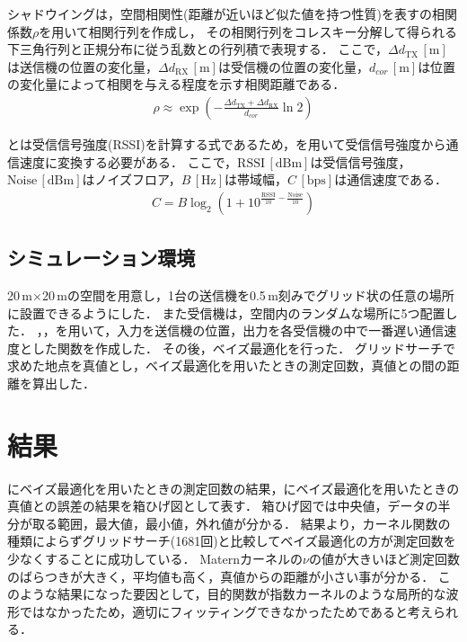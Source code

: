 \documentclass[twocolumn]{ltjarticle}
\begin{document}
シャドウイングは，空間相関性(距離が近いほど似た値を持つ性質)を表すの相関係数\(\rho\)を用いて相関行列を作成し，
その相関行列をコレスキー分解して得られる下三角行列と正規分布に従う乱数との行列積で表現する\cite{shadowing}．
ここで，\(\Delta d_{\mathrm{TX}}\,\mathrm{[m]}\)は送信機の位置の変化量，\(\Delta d_{\mathrm{RX}}\,\mathrm{[m]}\)は受信機の位置の変化量，\(d_{cor}\,\mathrm{[m]}\)は位置の変化量によって相関を与える程度を示す相関距離である．
\begin{align}
	\rho \approx \exp \left( - \frac{\Delta d_{\mathrm{TX}} + \Delta d_{\mathrm{RX}}}{d_{cor}} \ln 2 \right) \label{eq:shadowing}
\end{align}

とは受信信号強度(RSSI)を計算する式であるため，を用いて受信信号強度から通信速度に変換する必要がある．
ここで，\(\mathrm{RSSI}\,[\mathrm{dBm}]\)は受信信号強度，\(\mathrm{Noise}\,[\mathrm{dBm}]\)はノイズフロア，\(B\,[\mathrm{Hz}]\)は帯域幅，\(C\,[\mathrm{bps}]\)は通信速度である．
\begin{align}
	C = B \log_2 \left( 1 + 10^{\frac{\mathrm{RSSI}}{10}-\frac{\mathrm{Noise}}{10}} \right) \label{eq:capacity}
\end{align}
\subsection{シミュレーション環境}

20\(\,\)m\(\times\)20\(\,\)mの空間を用意し，1台の送信機を0.5\(\,\mathrm{m}\)刻みでグリッド状の任意の場所に設置できるようにした．
また受信機は，空間内のランダムな場所に5つ配置した．
，，を用いて，入力を送信機の位置，出力を各受信機の中で一番遅い通信速度とした関数を作成した．
その後，ベイズ最適化を行った．
グリッドサーチで求めた地点を真値とし，ベイズ最適化を用いたときの測定回数，真値との間の距離を算出した．
\section{結果}

にベイズ最適化を用いたときの測定回数の結果，にベイズ最適化を用いたときの真値との誤差の結果を箱ひげ図として表す．
箱ひげ図では中央値，データの半分が取る範囲，最大値，最小値，外れ値が分かる．
結果より，カーネル関数の種類によらずグリッドサーチ(1681回)と比較してベイズ最適化の方が測定回数を少なくすることに成功している．
Maternカーネルの\(\nu\)の値が大きいほど測定回数のばらつきが大きく，平均値も高く，真値からの距離が小さい事が分かる．
このような結果になった要因として，目的関数が指数カーネルのような局所的な波形ではなかったため，適切にフィッティングできなかったためであると考えられる．
\end{document}

